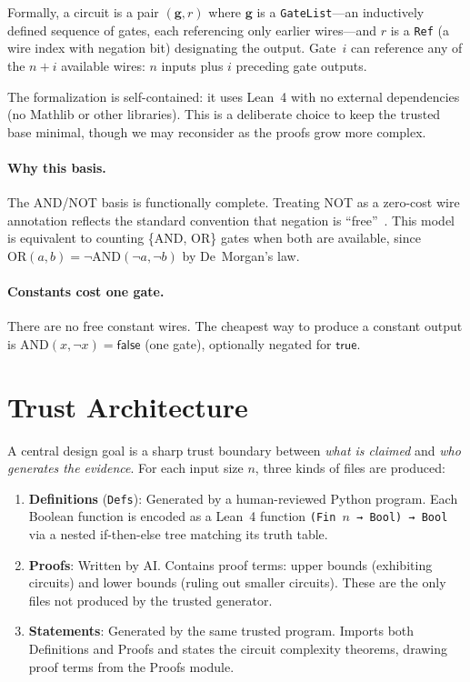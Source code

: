 \documentclass[11pt]{article}
\begin{document}
Formally, a circuit is a pair $(\mathbf{g}, r)$ where $\mathbf{g}$ is a
\texttt{GateList}---an inductively defined sequence of gates, each referencing
only earlier wires---and $r$ is a \texttt{Ref} (a wire index with negation bit)
designating the output. Gate~$i$ can reference any of the $n + i$ available
wires: $n$ inputs plus $i$ preceding gate outputs.

The formalization is self-contained: it uses Lean~4 with no external
dependencies (no Mathlib or other libraries). This is a deliberate choice to
keep the trusted base minimal, though we may reconsider as the proofs grow more
complex.

\paragraph{Why this basis.} The AND/NOT basis is functionally complete.
Treating NOT as a zero-cost wire annotation reflects the standard convention
that negation is ``free''~\cite{arora-barak}. This model is equivalent to
counting \{AND, OR\} gates when both are available, since
$\text{OR}(a,b) = \lnot\text{AND}(\lnot a, \lnot b)$ by De~Morgan's law.

\paragraph{Constants cost one gate.} There are no free constant wires. The
cheapest way to produce a constant output is $\text{AND}(x, \lnot x) =
\mathsf{false}$ (one gate), optionally negated for $\mathsf{true}$.

\section{Trust Architecture}

A central design goal is a sharp trust boundary between \emph{what is claimed}
and \emph{who generates the evidence}. For each input size $n$, three kinds of
files are produced:

\begin{enumerate}[leftmargin=*]
\item \textbf{Definitions} (\texttt{Defs}): Generated by a human-reviewed
  Python program. Each Boolean function is encoded as a Lean~4 function
  \texttt{(Fin $n$ → Bool) → Bool} via a nested if-then-else tree matching
  its truth table.

\item \textbf{Proofs}: Written by AI. Contains proof terms: upper bounds
  (exhibiting circuits) and lower bounds (ruling out smaller circuits). These
  are the only files not produced by the trusted generator.

\item \textbf{Statements}: Generated by the same trusted program. Imports
  both Definitions and Proofs and states the circuit complexity theorems,
  drawing proof terms from the Proofs module.
\end{enumerate}
\end{document}
